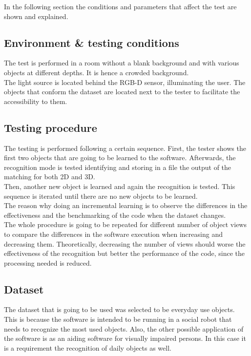 	In the following section the conditions and parameters that affect the test are shown and explained. 

	\subsection{Environment \& testing conditions}
		The test is performed in a room without a blank background and with various objects at different depths. It is hence a crowded background. 
		\\

		The light source is located behind the RGB-D sensor, illuminating the user. The objects that conform the dataset are located next to the tester to facilitate the accessibility to them. 

	\subsection{Testing procedure}
		The testing is performed following a certain sequence. First, the tester shows the first two objects that are going to be learned to the software. Afterwards, the recognition mode is tested identifying and storing in a file the output of the matching for both 2D and 3D. 
		\\

		Then, another new object is learned and again the recognition is tested. This sequence is iterated until there are no new objects to be learned. 
		\\

		The reason why doing an incremental learning is to observe the differences in the effectiveness and the benchmarking of the code when the dataset changes. 
		\\

		The whole procedure is going to be repeated for different number of object views to compare the differences in the software execution when increasing and decreasing them. Theoretically, decreasing the number of views should worse the effectiveness of the recognition but better the performance of the code, since the processing needed is reduced.

	\subsection{Dataset}
		The dataset that is going to be used was selected to be everyday use objects. This is because the software is intended to be running in a social robot that needs to recognize the most used objects. Also, the other possible application of the software is as an aiding software for visually impaired persons. In this case it is a requirement the recognition of daily objects as well.  
		\\

